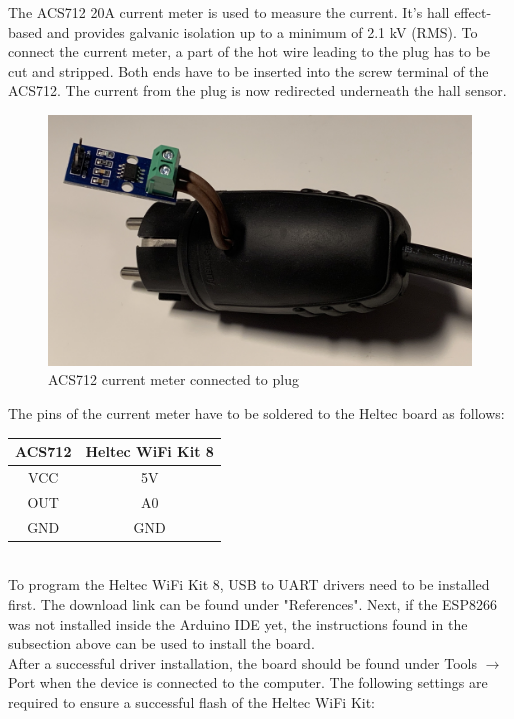 The ACS712 20A current meter is used to measure the current.
It's hall effect-based and provides galvanic isolation up to a minimum of 2.1 kV (RMS)\cite{acs712}.
To connect the current meter, a part of the hot wire leading to the plug has to be cut and stripped.
Both ends have to be inserted into the screw terminal of the ACS712.
The current from the plug is now redirected underneath the hall sensor.
\\
\begin{figure}[H]
    \includegraphics[width=\textwidth]{img/acs712.jpg}
    \caption{ACS712 current meter connected to plug}
    \label{fig:acs712}
\end{figure}

The pins of the current meter have to be soldered to the Heltec board as follows:
\\
\begin{center}
    \begin{tabular} { |c|c| }
        \hline
        ACS712 & Heltec WiFi Kit 8 \\
        \hline\hline
        VCC & 5V \\
        \hline
        OUT & A0 \\
        \hline
        GND & GND \\
        \hline
    \end{tabular}
    \label{tab:currentmeter}
\end{center}
\leavevmode
\\
To program the Heltec WiFi Kit 8, USB to UART drivers need to be installed first.
The download link can be found under "References"\cite{vcp-drivers}.
Next, if the ESP8266 was not installed inside the Arduino IDE yet, the instructions found in the subsection above can be used to install the board.
\\
After a successful driver installation, the board should be found under Tools $\rightarrow$ Port when the device is connected to the computer.
\newpage
The following settings are required to ensure a successful flash of the Heltec WiFi Kit:

